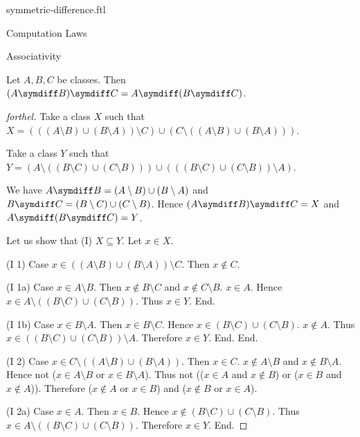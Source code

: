 \documentclass{naproche-library}
\begin{document}
\begin{smodule}[title=Symmetric Difference]{symmetric-difference.ftl}
\begin{sfragment}{Computation Laws}
  \begin{sfragment}{Associativity}
    \begin{proposition}[forthel,id=FOUNDATIONS_03_8680845204258816]
      Let $A, B, C$ be classes.
      Then $(A \symdiff B) \symdiff C = A \symdiff (B \symdiff C)$.
    \end{proposition}
    \begin{proof}[forthel]
      Take a class $X$ such that $X = (((A \setminus B) \cup (B \setminus A)) \setminus C) \cup (C \setminus ((A \setminus B) \cup (B \setminus A)))$.

      Take a class $Y$ such that $Y = (A \setminus ((B \setminus C) \cup (C \setminus B))) \cup (((B \setminus C) \cup (C \setminus B)) \setminus A)$.

      We have $A \symdiff B = (A \setminus B) \cup (B \setminus A)$ and $B \symdiff C = (B \setminus C) \cup (C \setminus B)$.
      Hence $(A \symdiff B) \symdiff C = X$ and $A \symdiff (B \symdiff C) = Y$.

      Let us show that (I) $X \subseteq Y$.
        Let $x \in X$.

        (I 1) Case $x \in ((A \setminus B) \cup (B \setminus A)) \setminus C$.
          Then $x \notin C$.

          (I 1a) Case $x \in A \setminus B$.
            Then $x \notin B \setminus C$ and $x \notin C \setminus B$. $x \in A$.
            Hence $x \in A \setminus ((B \setminus C) \cup (C \setminus B))$.
            Thus $x \in Y$.
          End.

          (I 1b) Case $x \in B \setminus A$.
            Then $x \in B \setminus C$.
            Hence $x \in (B \setminus C) \cup (C \setminus B)$. $x \notin A$.
            Thus $x \in ((B \setminus C) \cup (C \setminus B)) \setminus A$.
            Therefore $x \in Y$.
          End.
        End.

        (I 2) Case $x \in C \setminus ((A \setminus B) \cup (B \setminus A))$.
          Then $x \in C$.
          $x \notin A \setminus B$ and $x \notin B \setminus A$.
          Hence not ($x \in A \setminus B$ or $x \in B \setminus A$).
          Thus not (($x \in A$ and $x \notin B$) or ($x \in B$ and $x \notin A$)).
          Therefore ($x \notin A$ or $x \in B$) and ($x \notin B$ or $x \in A$).

          (I 2a) Case $x \in A$.
            Then $x \in B$.
            Hence $x \notin (B \setminus C) \cup (C \setminus B)$.
            Thus $x \in A \setminus ((B \setminus C) \cup (C \setminus B))$.
            Therefore $x \in Y$.
          End.


\end{proof}
\end{sfragment}
\end{sfragment}
\end{smodule}
\end{document}
